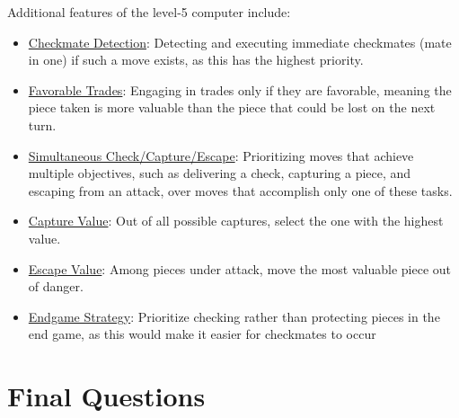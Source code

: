 \documentclass[12pt]{article}
\begin{document}
Additional features of the level-5 computer include:
\begin{itemize}
    \item \underline{Checkmate Detection}: Detecting and executing immediate checkmates (mate in one) if such a move exists, as this has the highest priority.
    \item \underline{Favorable Trades}: Engaging in trades only if they are favorable, meaning the piece taken is more valuable than the piece that could be lost on the next turn.
    \item \underline{Simultaneous Check/Capture/Escape}: Prioritizing moves that achieve multiple objectives, such as delivering a check, capturing a piece, and escaping from an attack, over moves that accomplish only one of these tasks.
    \item \underline{Capture Value}: Out of all possible captures, select the one with the highest value.
    \item \underline{Escape Value}: Among pieces under attack, move the most valuable piece out of danger.
    \item \underline{Endgame Strategy}: Prioritize checking rather than protecting pieces in the end game, as this would make it easier for checkmates to occur
\end{itemize}

\section*{Final Questions}
\end{document}
